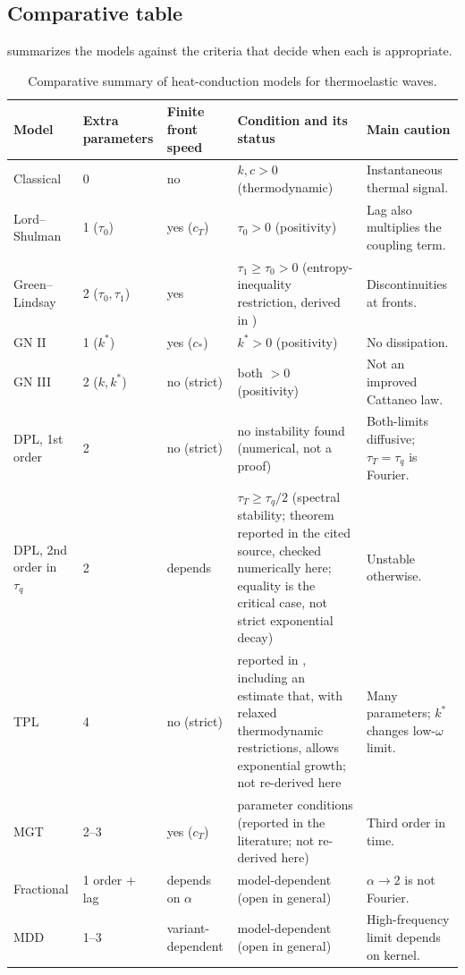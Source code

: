 \subsection{Comparative table}
 summarizes the models against the criteria that decide when each is appropriate.
\begin{table}[ht]\centering\small
\caption{Comparative summary of heat-conduction models for thermoelastic waves.}\label{tab:final}
\begin{tabularx}{\textwidth}{@{}p{2.1cm}p{1.5cm}p{1.8cm}p{4.9cm}X@{}}\toprule
Model & Extra parameters & Finite front speed & Condition and its status & Main caution\\\midrule
Classical & 0 & no & $k,c>0$ (thermodynamic) & Instantaneous thermal signal.\\
Lord--Shulman & 1 ($\tau_0$) & yes ($c_T$) & $\tau_0>0$ (positivity) & Lag also multiplies the coupling term.\\
Green--Lindsay & 2 ($\tau_0,\tau_1$) & yes & $\tau_1\ge\tau_0>0$ (entropy-inequality restriction, derived in \citep{Green1972}) & Discontinuities at fronts.\\
GN II & 1 ($k^*$) & yes ($c_*$) & $k^*>0$ (positivity) & No dissipation.\\
GN III & 2 ($k,k^*$) & no (strict) & both $>0$ (positivity) & Not an improved Cattaneo law.\\
DPL, 1st order & 2 & no (strict) & no instability found (numerical, not a proof) & Both-limits diffusive; $\tau_T=\tau_q$ is Fourier.\\
DPL, 2nd order in $\tau_q$ & 2 & depends & $\tau_T\ge\tau_q/2$ (spectral stability; theorem reported in the cited source, checked numerically here; equality is the critical case, not strict exponential decay) & Unstable otherwise.\\
TPL & 4 & no (strict) & reported in \citep{Chirita2016}, including an estimate that, with relaxed thermodynamic restrictions, allows exponential growth; not re-derived here & Many parameters; $k^*$ changes low-$\omega$ limit.\\
MGT & 2--3 & yes ($c_T$) & parameter conditions (reported in the literature; not re-derived here) & Third order in time.\\
Fractional & 1 order + lag & depends on $\alpha$ & model-dependent (open in general) & $\alpha\to2$ is not Fourier.\\
MDD & 1--3 & variant-dependent & model-dependent (open in general) & High-frequency limit depends on kernel.\\\bottomrule
\end{tabularx}
\par\smallskip{}
\end{table}

